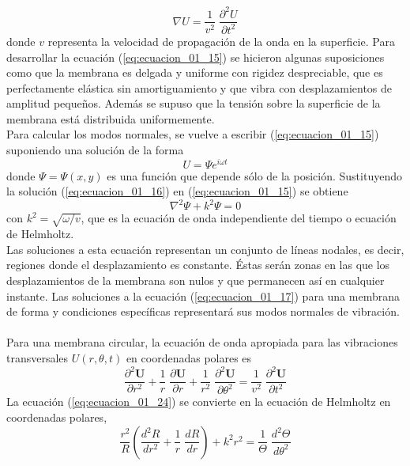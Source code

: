 \begin{equation}
\nabla U = \dfrac{1}{v^{2}} \; \dfrac{\partial^{2} U }{\partial t^{2}}
\label{eq:ecuacion_01_15}
\end{equation}
donde $v$ representa la velocidad de propagación de la onda en la superficie. Para desarrollar la ecuación (\ref{eq:ecuacion_01_15}) se hicieron algunas suposiciones como que la membrana es delgada y uniforme con rigidez despreciable, que es perfectamente elástica sin amortiguamiento y que vibra con desplazamientos de amplitud pequeños. Además se supuso que la tensión sobre la superficie de la membrana está distribuida uniformemente.
\\
Para calcular los modos normales, se vuelve a escribir (\ref{eq:ecuacion_01_15}) suponiendo una solución de la forma
\begin{equation}
U = \Psi e^{i \omega t}
\label{eq:ecuacion_01_16}
\end{equation}
donde $\Psi =  \Psi(x,y)$ es una función que depende sólo de la posición. Sustituyendo la solución (\ref{eq:ecuacion_01_16}) en (\ref{eq:ecuacion_01_15}) se obtiene
\begin{equation}
\nabla^{2} \Psi + k^{2} \Psi = 0
\label{eq:ecuacion_01_17}
\end{equation}
con $k^{2} = \sqrt{\omega/v}$, que es la ecuación de onda independiente del tiempo o ecuación de Helmholtz.
\\
Las soluciones a esta ecuación representan un conjunto de líneas nodales, es decir, regiones donde el desplazamiento es constante. Éstas serán zonas en las que los desplazamientos de la membrana son nulos y que permanecen así en cualquier instante. Las soluciones a la ecuación (\ref{eq:ecuacion_01_17}) para una membrana de forma y condiciones específicas representará sus modos normales de vibración.
\\
\\
Para una membrana circular, la ecuación de onda apropiada para las vibraciones transversales $U(r, \theta, t)$ en coordenadas polares es
\begin{equation}
\dfrac{\partial^{2} \mathbf{U}}{\partial r^{2}} + \dfrac{1}{r} \; \dfrac{\partial \mathbf{U}}{\partial r} + \dfrac{1}{r^{2}} \; \dfrac{\partial^{2} \mathbf{U}}{\partial \theta^{2}} = \dfrac{1}{v^{2}} \; \dfrac{\partial^{2} \mathbf{U}}{\partial t^{2}}
\label{eq:ecuacion_01_24}  
\end{equation}
La ecuación (\ref{eq:ecuacion_01_24}) se convierte en la ecuación de Helmholtz en coordenadas polares,
\begin{equation}
\dfrac{r^{2}}{R} \left( \dfrac{d^{2} R}{d r^{2}} + \dfrac{1}{r} \; \dfrac{d R}{d r} \right) + k^{2} r^{2} = \dfrac{1}{\Theta} \; \dfrac{d^{2} \Theta}{d \theta^{2}}
\label{eq:ecuacion_01_25}
\end{equation}
